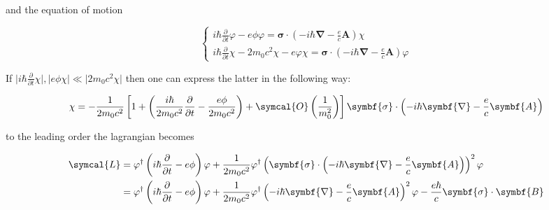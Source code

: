 and the equation of motion

\begin{equation}
\begin{cases}
  i \hbar \frac{\partial}{\partial t} \varphi - e \phi \varphi = \symbf{\sigma} \cdot \left(- i \hbar \symbf{\nabla} - \frac{e}{c} \symbf{A} \right) \chi \\
  i \hbar \frac{\partial}{\partial t} \chi - 2 m_0 c^2 \chi - e \varphi \chi = \symbf{\sigma} \cdot \left(- i \hbar \symbf{\nabla} - \frac{e}{c} \symbf{A} \right) \varphi
\end{cases}
\end{equation}

If $ \vert i \hbar \frac{\partial}{\partial t} \chi \vert , \vert e \phi \chi \vert  \ll \vert 2 m_0 c^2 \chi \vert $ then one can express the latter in the following way:

\begin{equation}
  \chi = - \frac{1}{2 m_0 c^2} \left[ 1 + \left( \frac{i \hbar}{2 m_0 c^2} \frac{\partial}{\partial t} - \frac{e \phi}{2 m_0 c^2} \right) + \symcal{O} \left( \frac{1}{m_0^2} \right) \right] \symbf{\sigma} \cdot \left( - i \hbar \symbf{\nabla} - \frac{e}{c} \symbf{A} \right)
\end{equation}

to the leading order the lagrangian becomes

\begin{equation}
\begin{split}
  \symcal{L} &= \varphi^\dagger \left(i \hbar \frac{\partial}{\partial t} - e \phi \right) \varphi + \frac{1}{2 m_0 c^2} \varphi^\dagger \left( \symbf{\sigma} \cdot \left( - i \hbar \symbf{\nabla} - \frac{e}{c} \symbf{A} \right) \right)^2 \varphi \\
  &= \varphi^\dagger \left(i \hbar \frac{\partial}{\partial t} - e \phi \right) \varphi + \frac{1}{2 m_0 c^2} \varphi^\dagger \left( - i \hbar \symbf{\nabla} - \frac{e}{c} \symbf{A} \right)^2 \varphi  - \frac{e \hbar}{c} \symbf{\sigma} \cdot \symbf{B}
\end{split}
\end{equation}

